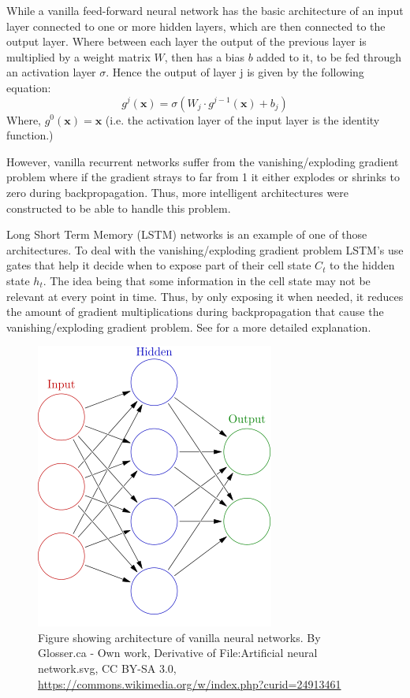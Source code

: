 \documentclass[bsc,frontabs,twoside,singlespacing,parskip,deptreport]{infthesis}     %
\begin{document}
While a vanilla feed-forward neural network has the basic architecture of an input layer connected to one or more hidden layers, which are then connected to the output layer. Where between each layer the output of the previous layer is multiplied by a weight matrix $W$, then has a bias $b$ added to it, to be fed through an activation layer $\sigma$. Hence the output of layer j is given by the following equation:
$$g^j(\mathbf{x}) = \sigma(W_j\cdot g^{j-1}(\mathbf{x}) + b_j)$$
Where, $g^0(\mathbf{x})=\mathbf{x}$ (i.e. the activation layer of the input layer is the identity function.)

However, vanilla recurrent networks suffer from the vanishing/exploding gradient problem where if the gradient strays to far from 1 it either explodes or shrinks to zero during backpropagation. Thus, more intelligent architectures were constructed to be able to handle this problem.

Long Short Term Memory (LSTM) networks is an example of one of those architectures. To deal with the vanishing/exploding gradient problem LSTM's use gates that help it decide when to expose part of their cell state $C_t$ to the hidden state $h_t$. The idea being that some information in the cell state may not be relevant at every point in time. Thus, by only exposing it when needed, it reduces the amount of gradient multiplications during backpropagation that cause the vanishing/exploding gradient problem. See \citep{kawakami2008supervised} for a more detailed explanation.

\begin{figure}
    \centering
    \includegraphics[scale=0.5]{report/images/Colored_neural_network.png}
    \caption{Figure showing architecture of vanilla neural networks. By Glosser.ca - Own work, Derivative of File:Artificial neural network.svg, CC BY-SA 3.0, \url{https://commons.wikimedia.org/w/index.php?curid=24913461}}
    \label{fig:vanilarch}
\end{figure}
\end{document}
